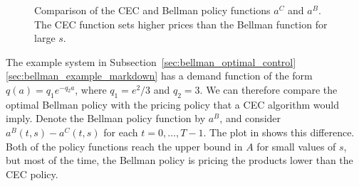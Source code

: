 \documentclass{rsproca_new}
\makeatletter
\theoremstyle{definition}
\renewcommand{\todo}[2][]{\tikzexternaldisable\@todo[#1]{#2}\tikzexternalenable}
\makeatother
\begin{document}
\begin{figure}[htbp]
  \caption{Comparison of the CEC and Bellman policy functions $a^C$ and
    $a^B$.
    The CEC function sets
    higher prices than the Bellman function for large $s$.
  }\label{fig:bellman_det_policy_difference}
\end{figure}

The example system in Subsection~\ref{sec:bellman_optimal_control}\ref{sec:bellman_example_markdown} has a demand
function of the form $q(a)=q_1e^{-q_2a}$, where $q_1=e^2/3$ and
$q_2=3$. We can therefore compare the optimal Bellman policy with the
pricing policy that a CEC algorithm would imply.
Denote the Bellman policy function by $a^B$, and consider
$a^B(t,s)-a^C(t,s)$ for each $t=0,\dots,T-1$. The plot in
 shows this difference.
Both of the policy functions reach the upper bound in $A$ for small values
of $s$, but most of the time, the Bellman policy is pricing the products
lower than the CEC policy.
\end{document}
